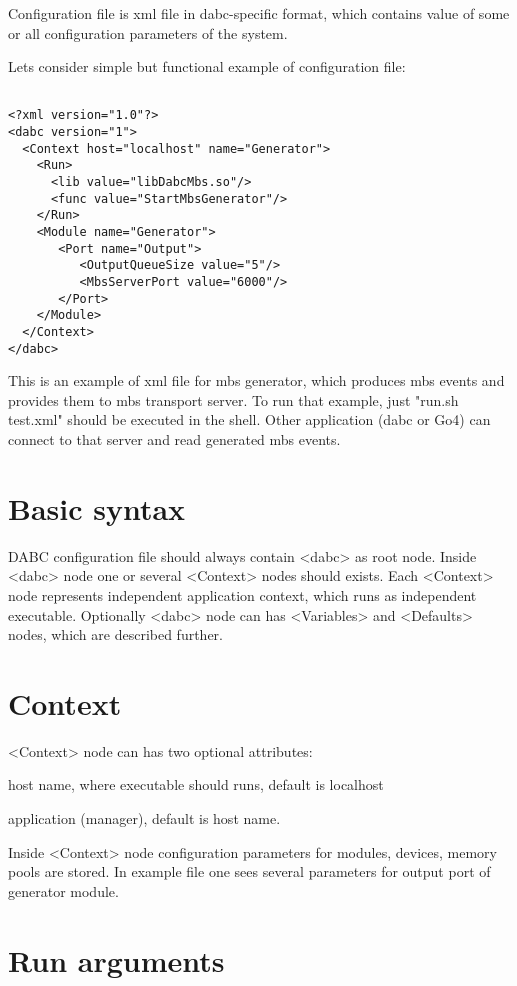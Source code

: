 Configuration file is xml file in dabc-specific format, which contains 
value of some or all configuration parameters of the system. 

Lets consider simple but functional example of configuration file:

\begin{verbatim}

<?xml version="1.0"?>
<dabc version="1">
  <Context host="localhost" name="Generator">
    <Run>
      <lib value="libDabcMbs.so"/>
      <func value="StartMbsGenerator"/>
    </Run>
    <Module name="Generator">
       <Port name="Output">
          <OutputQueueSize value="5"/>
          <MbsServerPort value="6000"/>
       </Port>
    </Module>
  </Context>
</dabc>

\end{verbatim}

This is an example of xml file for mbs generator, which produces 
mbs events and provides them to mbs transport server. 
To run that example, just "run.sh test.xml" should be executed in the shell.
Other application
(dabc or Go4) can connect to that server and read generated mbs events.


\section{Basic syntax}

DABC configuration file should always contain <dabc> as root node. 
Inside <dabc> node one or several <Context> nodes should exists.
Each <Context> node represents independent application context, which runs as
independent executable. 
Optionally <dabc> node can has <Variables> and <Defaults> nodes, which are described further. 


\section{Context}

<Context> node can has two optional attributes:
\bdes
\item["host"] host name, where executable should runs, default is localhost
\item["name"] application (manager), default is host name.
\edes

Inside <Context> node configuration parameters for modules, devices, memory pools are stored.
In example file one sees several parameters for output port of generator module.  


\section{Run arguments}

